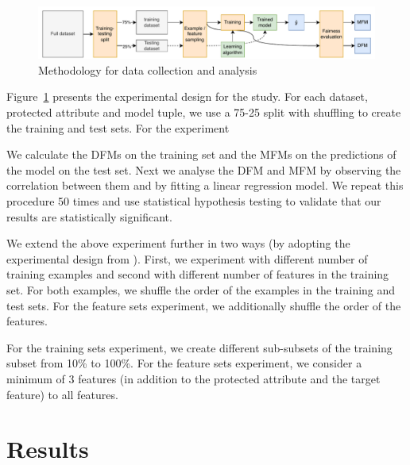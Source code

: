 \documentclass{article}
\begin{document}
\begin{figure}
  \centering
  \includegraphics[width=0.95\linewidth]{method.pdf}
  \caption{Methodology for data collection and analysis}
  \label{fig:method}
\end{figure}

Figure \ref{fig:method} presents the experimental design for the
study. For each dataset, protected attribute and model tuple, we use a
75-25 split with shuffling to create the training and test sets. For
the experiment


We calculate the DFMs on the training set and the MFMs on the
predictions of the model on the test set. Next we analyse the DFM and
MFM by observing the correlation between them and by fitting a linear
regression model. We repeat this procedure 50 times and use
statistical hypothesis testing to validate that our results are
statistically significant.

We extend the above experiment further in two ways (by adopting the
experimental design from \cite{zhang2021ignorance}). First, we
experiment with different number of training examples and second with
different number of features in the training set. For both examples,
we shuffle the order of the examples in the training and test sets. For
the feature sets experiment, we additionally shuffle the order of the
features.

For the training sets experiment, we create different sub-subsets of
the training subset from 10\% to 100\%. For the feature sets
experiment, we consider a minimum of 3 features (in addition to the
protected attribute and the target feature) to all features.


\section{Results}\label{sec:results}
\end{document}
